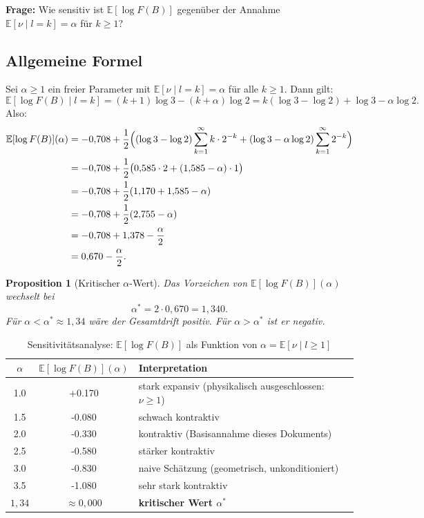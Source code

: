 \documentclass[12pt,a4paper]{article}
\newtheorem{proposition}[definition]{Proposition}
\newcommand{\E}{\mathbb{E}}
\newcommand{\logF}{\log F(B)}
\begin{document}
\begin{tcolorbox}[sensitivitaet]
\textbf{Frage:} Wie sensitiv ist $\E[\logF]$ gegenüber der Annahme
$\E[\nu \mid l{=}k] = \alpha$ für $k \geq 1$?
\end{tcolorbox}

\subsection{Allgemeine Formel}

Sei $\alpha \geq 1$ ein freier Parameter mit $\E[\nu \mid l{=}k] = \alpha$
für alle $k \geq 1$.
Dann gilt:
\[
  \E[\logF \mid l=k] = (k+1)\log 3 - (k+\alpha)\log 2
  = k(\log 3 - \log 2) + \log 3 - \alpha\log 2.
\]
Also:
\begin{align*}
  \E[\logF](\alpha)
  &= -0{,}708
     + \frac{1}{2}\Bigl(
         (\log 3 - \log 2)\sum_{k=1}^{\infty} k \cdot 2^{-k}
         + (\log 3 - \alpha\log 2)\sum_{k=1}^{\infty} 2^{-k}
       \Bigr)\\
  &= -0{,}708 + \frac{1}{2}\bigl(0{,}585\cdot 2 + (1{,}585 - \alpha)\cdot 1\bigr)\\
  &= -0{,}708 + \frac{1}{2}(1{,}170 + 1{,}585 - \alpha)\\
  &= -0{,}708 + \frac{1}{2}(2{,}755 - \alpha)\\
  &= -0{,}708 + 1{,}378 - \frac{\alpha}{2}\\
  &= 0{,}670 - \frac{\alpha}{2}.
\end{align*}

\begin{proposition}[Kritischer $\alpha$-Wert]
\label{prop:kritisch}
Das Vorzeichen von $\E[\logF](\alpha)$ wechselt bei
\[
  \alpha^* = 2 \cdot 0{,}670 = 1{,}340.
\]
Für $\alpha < \alpha^* \approx 1{,}34$ wäre der Gesamtdrift positiv.
Für $\alpha > \alpha^*$ ist er negativ.
\end{proposition}

\begin{table}[h!]
\centering
\caption{Sensitivitätsanalyse: $\E[\logF]$ als Funktion von $\alpha = \E[\nu \mid l{\geq}1]$}
\label{tab:sensitivitaet}
\renewcommand{\arraystretch}{1.3}
\begin{tabular}{
  S[table-format=1.1]
  S[table-format=+1.4]
  l
}
\toprule
{$\alpha$} & {$\E[\logF](\alpha)$} & Interpretation \\
 & +0.170 & stark expansiv (physikalisch ausgeschlossen: $\nu \geq 1$) \\
1.5 & -0.080 & schwach kontraktiv \\
2.0 & -0.330 & kontraktiv (Basisannahme dieses Dokuments) \\
2.5 & -0.580 & stärker kontraktiv \\
3.0 & -0.830 & naive Schätzung (geometrisch, unkonditioniert) \\
3.5 & -1.080 & sehr stark kontraktiv \\
\midrule
{$1{,}34$} & {$\approx 0{,}000$} & \textbf{kritischer Wert $\alpha^*$} \\
\bottomrule
\end{tabular}
\end{table}
\end{document}
